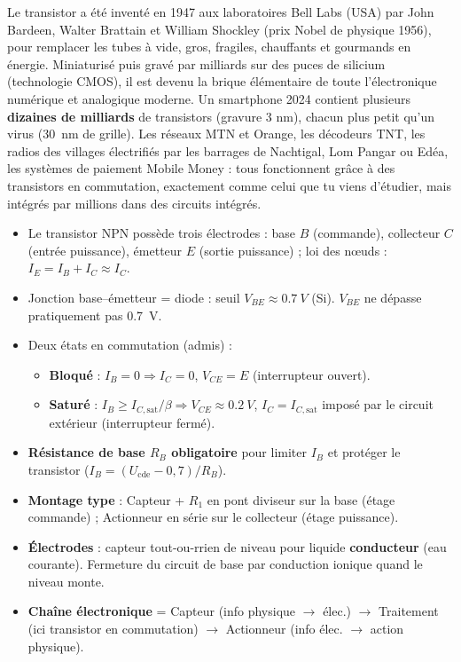 \documentclass[11pt]{article}
\begin{document}
\begin{savaistu}
Le transistor a été inventé en 1947 aux laboratoires Bell Labs (USA) par John Bardeen, Walter Brattain et William Shockley (prix Nobel de physique 1956), pour remplacer les tubes à vide, gros, fragiles, chauffants et gourmands en énergie. Miniaturisé puis gravé par milliards sur des puces de silicium (technologie CMOS), il est devenu la brique élémentaire de toute l'électronique numérique et analogique moderne. Un smartphone 2024 contient plusieurs \textbf{dizaines de milliards} de transistors (gravure 3 nm), chacun plus petit qu'un virus (\SI{30}{nm} de grille). Les réseaux MTN et Orange, les décodeurs TNT, les radios des villages électrifiés par les barrages de Nachtigal, Lom Pangar ou Edéa, les systèmes de paiement Mobile Money : tous fonctionnent grâce à des transistors en commutation, exactement comme celui que tu viens d'étudier, mais intégrés par millions dans des circuits intégrés.
\end{savaistu}

\begin{aretenir}
\begin{itemize}
\item Le transistor NPN possède trois électrodes : base $B$ (commande), collecteur $C$ (entrée puissance), émetteur $E$ (sortie puissance) ; loi des nœuds : $I_E = I_B + I_C \approx I_C$.
\item Jonction base--émetteur = diode : seuil $V_{BE} \approx \SI{0,7}{V}$ (Si). $V_{BE}$ ne dépasse pratiquement pas \SI{0,7}{V}.
\item Deux états en commutation (admis) :
  \begin{itemize}
  \item \textbf{Bloqué} : $I_B = 0 \Rightarrow I_C = 0$, $V_{CE} = E$ (interrupteur ouvert).
  \item \textbf{Saturé} : $I_B \geq I_{C,\text{sat}}/\beta \Rightarrow V_{CE} \approx \SI{0,2}{V}$, $I_C = I_{C,\text{sat}}$ imposé par le circuit extérieur (interrupteur fermé).
  \end{itemize}
\item \textbf{Résistance de base $R_B$ obligatoire} pour limiter $I_B$ et protéger le transistor ($I_B = (U_{\text{cde}} - 0,7)/R_B$).
\item \textbf{Montage type} : Capteur + $R_1$ en pont diviseur sur la base (étage commande) ; Actionneur en série sur le collecteur (étage puissance).
\item \textbf{Électrodes} : capteur tout-ou-rrien de niveau pour liquide \textbf{conducteur} (eau courante). Fermeture du circuit de base par conduction ionique quand le niveau monte.
\item \textbf{Chaîne électronique} = Capteur (info physique $\to$ élec.) $\to$ Traitement (ici transistor en commutation) $\to$ Actionneur (info élec. $\to$ action physique).
\end{itemize}
\end{aretenir}
\end{document}
